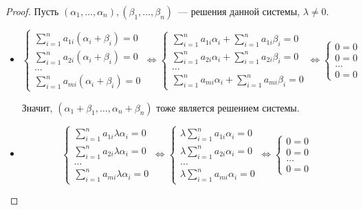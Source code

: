 \begin{proof}
Пусть $(\alpha_1,  \ldots, \alpha_n), (\beta_1,  \ldots, \beta_n)$~--- решения данной системы, $\lambda \neq 0$.
\begin{itemize}
	\item \begin{equation*}
	\begin{cases}
	\displaystyle \sum_{i=1}^n a_{1i} (\alpha_i + \beta_i) = 0 \\
	\displaystyle \sum_{i=1}^n a_{2i} (\alpha_i + \beta_i) = 0 \\
	\ldots \\
	\displaystyle \sum_{i=1}^n a_{mi} (\alpha_i + \beta_i) = 0
	\end{cases}
	\Leftrightarrow
	\begin{cases}
	\displaystyle \sum_{i=1}^n a_{1i} \alpha_i + \sum_{i=1}^n a_{1i} \beta_i = 0 \\
	\displaystyle \sum_{i=1}^n a_{2i} \alpha_i + \sum_{i=1}^n a_{2i} \beta_i = 0 \\
	\ldots \\
	\displaystyle \sum_{i=1}^n a_{mi} \alpha_i + \sum_{i=1}^n a_{mi} \beta_i = 0
	\end{cases}
	\Leftrightarrow
	\begin{cases}
	0 = 0 \\
	0 = 0 \\
	\ldots \\
	0 = 0
	\end{cases}
	\end{equation*}
	
	Значит, $(\alpha_1 + \beta_1, \ldots, \alpha_n + \beta_n)$ тоже является решением системы.
	
	\item \begin{equation*}
	\begin{cases}
	\displaystyle \sum_{i=1}^n a_{1i} \lambda \alpha_i = 0 \\
	\displaystyle \sum_{i=1}^n a_{2i} \lambda \alpha_i = 0 \\
	\ldots \\
	\displaystyle \sum_{i=1}^n a_{mi} \lambda \alpha_i = 0
	\end{cases}
	\Leftrightarrow
	\begin{cases}
	\displaystyle \lambda \sum_{i=1}^n a_{1i} \alpha_i = 0 \\
	\displaystyle \lambda \sum_{i=1}^n a_{2i} \alpha_i = 0 \\
	\ldots \\
	\displaystyle \lambda \sum_{i=1}^n a_{mi} \alpha_i = 0
	\end{cases}
	\Leftrightarrow
	\begin{cases}
	0 = 0 \\
	0 = 0 \\
	\ldots \\
	0 = 0
	\end{cases}
	\end{equation*}
	

\end{itemize}
\end{proof}
